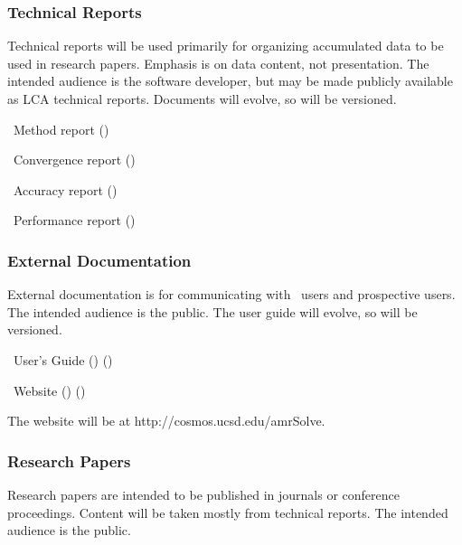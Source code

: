 \documentclass[11pt]{article}
\begin{document}

\subsubsection{Technical Reports}

Technical reports will be used primarily for organizing accumulated
data to be used in research papers.  Emphasis is on data content, not
presentation.  The intended audience is the software developer, but
may be made publicly available as LCA technical reports.  Documents
will evolve, so will be versioned.

\BeginENUMERATE
  \item  \amrSolve\ Method report      ()
  \item  \amrSolve\ Convergence report ()
  \item  \amrSolve\ Accuracy report    ()
  \item  \amrSolve\ Performance report ()
\EndENUMERATE


\subsubsection{External Documentation}

External documentation is for communicating with \amrSolve\ users and
prospective users.  The intended audience is the public.  The user
guide will evolve, so will be versioned.

\BeginENUMERATE
  \item  \amrSolve\ User's Guide      () ()
  \item  \amrSolve\ Website           () ()
\EndENUMERATE

The website will be at \textsf{http://cosmos.ucsd.edu/amrSolve}.


\subsubsection{Research Papers}

Research papers are intended to be published in journals or conference
proceedings.  Content will be taken mostly from technical reports.
The intended audience is the public.
\end{document}
